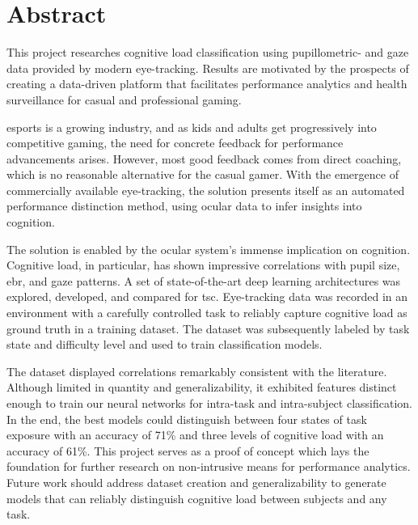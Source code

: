 \chapter*{Abstract}

This project researches cognitive load classification using pupillometric- and gaze data provided by modern eye-tracking. Results are motivated by the prospects of creating a data-driven platform that facilitates performance analytics and health surveillance for casual and professional gaming.

\acrfull{esports} is a growing industry, and as kids and adults get progressively into competitive gaming, the need for concrete feedback for performance advancements arises. However, most good feedback comes from direct coaching, which is no reasonable alternative for the casual gamer. With the emergence of commercially available eye-tracking, the solution presents itself as an automated performance distinction method, using ocular data to infer insights into cognition. 


The solution is enabled by the ocular system's immense implication on cognition. Cognitive load, in particular, has shown impressive correlations with pupil size, \acrfull{ebr}, and gaze patterns. A set of state-of-the-art deep learning architectures was explored, developed, and compared for \acrfull{tsc}. Eye-tracking data was recorded in an environment with a carefully controlled task to reliably capture cognitive load as ground truth in a training dataset. The dataset was subsequently labeled by task state and difficulty level and used to train classification models.

The dataset displayed correlations remarkably consistent with the literature. Although limited in quantity and generalizability, it exhibited features distinct enough to train our neural networks for intra-task and intra-subject classification. In the end, the best models could distinguish between four states of task exposure with an accuracy of 71\% and three levels of cognitive load with an accuracy of 61\%. This project serves as a proof of concept which lays the foundation for further research on non-intrusive means for performance analytics. Future work should address dataset creation and generalizability to generate models that can reliably distinguish cognitive load between subjects and any task.